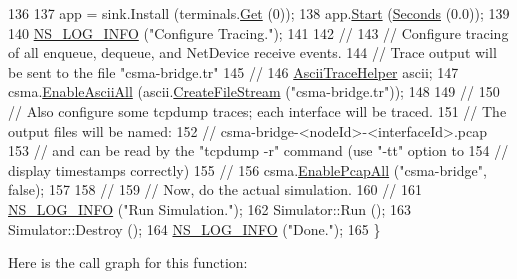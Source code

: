 \begin{DoxyCode}
136 
137   app = sink.Install (terminals.\hyperlink{classns3_1_1NodeContainer_a9ed96e2ecc22e0f5a3d4842eb9bf90bf}{Get} (0));
138   app.\hyperlink{classns3_1_1ApplicationContainer_a8eff87926507020bbe3e1390358a54a7}{Start} (\hyperlink{group__timecivil_ga33c34b816f8ff6628e33d5c8e9713b9e}{Seconds} (0.0));
139 
140   \hyperlink{group__logging_gafbd73ee2cf9f26b319f49086d8e860fb}{NS\_LOG\_INFO} (\textcolor{stringliteral}{"Configure Tracing."});
141 
142   \textcolor{comment}{//}
143   \textcolor{comment}{// Configure tracing of all enqueue, dequeue, and NetDevice receive events.}
144   \textcolor{comment}{// Trace output will be sent to the file "csma-bridge.tr"}
145   \textcolor{comment}{//}
146   \hyperlink{classns3_1_1AsciiTraceHelper}{AsciiTraceHelper} ascii;
147   csma.\hyperlink{classns3_1_1AsciiTraceHelperForDevice_a63e57c878526c732924e14c1e52cca8b}{EnableAsciiAll} (ascii.\hyperlink{classns3_1_1AsciiTraceHelper_a44960bf2ca32835024eaedd26d1c4f94}{CreateFileStream} (\textcolor{stringliteral}{"csma-bridge.tr"}));
148 
149   \textcolor{comment}{//}
150   \textcolor{comment}{// Also configure some tcpdump traces; each interface will be traced.}
151   \textcolor{comment}{// The output files will be named:}
152   \textcolor{comment}{//     csma-bridge-<nodeId>-<interfaceId>.pcap}
153   \textcolor{comment}{// and can be read by the "tcpdump -r" command (use "-tt" option to}
154   \textcolor{comment}{// display timestamps correctly)}
155   \textcolor{comment}{//}
156   csma.\hyperlink{classns3_1_1PcapHelperForDevice_a4ab183a2512120200d4a0e5d8ececd49}{EnablePcapAll} (\textcolor{stringliteral}{"csma-bridge"}, \textcolor{keyword}{false});
157 
158   \textcolor{comment}{//}
159   \textcolor{comment}{// Now, do the actual simulation.}
160   \textcolor{comment}{//}
161   \hyperlink{group__logging_gafbd73ee2cf9f26b319f49086d8e860fb}{NS\_LOG\_INFO} (\textcolor{stringliteral}{"Run Simulation."});
162   Simulator::Run ();
163   Simulator::Destroy ();
164   \hyperlink{group__logging_gafbd73ee2cf9f26b319f49086d8e860fb}{NS\_LOG\_INFO} (\textcolor{stringliteral}{"Done."});
165 \}
\end{DoxyCode}


Here is the call graph for this function\+:


